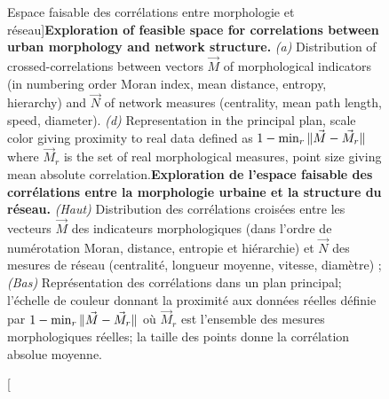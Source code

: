 \begin{figure}
\caption[Exploration of feasible space for correlations between urban morphology and network structure][Espace faisable des corrélations entre morphologie et réseau]{\textbf{Exploration of feasible space for correlations between urban morphology and network structure.} \textit{(a)} Distribution of crossed-correlations between vectors $\vec{M}$ of morphological indicators (in numbering order Moran index, mean distance, entropy, hierarchy) and $\vec{N}$ of network measures (centrality, mean path length, speed, diameter). \textit{(d)} Representation in the principal plan, scale color giving proximity to real data defined as $1 - \min_r \| \vec{M}-\vec{M}_r \|$ where $\vec{M}_r$ is the set of real morphological measures, point size giving mean absolute correlation.\label{fig:correlatedsyntheticdata:densnwcor}}{\textbf{Exploration de l'espace faisable des corrélations entre la morphologie urbaine et la structure du réseau.} \textit{(Haut)} Distribution des corrélations croisées entre les vecteurs $\vec{M}$ des indicateurs morphologiques (dans l'ordre de numérotation Moran, distance, entropie et hiérarchie) et $\vec{N}$ des mesures de réseau (centralité, longueur moyenne, vitesse, diamètre) ; \textit{(Bas)} Représentation des corrélations dans un plan principal; l'échelle de couleur donnant la proximité aux données réelles définie par $1 - \min_r \| \vec{M}-\vec{M}_r \|$ où $\vec{M}_r$ est l'ensemble des mesures morphologiques réelles; la taille des points donne la corrélation absolue moyenne.\label{fig:correlatedsyntheticdata:densnwcor}}
\end{figure}



